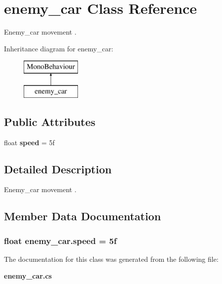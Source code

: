 \section{enemy\+\_\+car Class Reference}
\label{classenemy__car}


Enemy\+\_\+car movement .  


Inheritance diagram for enemy\+\_\+car\+:\begin{figure}[H]
\begin{center}
\leavevmode
\includegraphics[height=2.000000cm]{classenemy__car}
\end{center}
\end{figure}
\subsection*{Public Attributes}
\begin{DoxyCompactItemize}
\item 
float {\bf speed} = 5f
\end{DoxyCompactItemize}


\subsection{Detailed Description}
Enemy\+\_\+car movement . 



\subsection{Member Data Documentation}
\subsubsection[{speed}]{\setlength{\rightskip}{0pt plus 5cm}float enemy\+\_\+car.\+speed = 5f}\label{classenemy__car_a68b29b546daa237033646d23713f4578}


The documentation for this class was generated from the following file\+:\begin{DoxyCompactItemize}
\item 
{\bf enemy\+\_\+car.\+cs}\end{DoxyCompactItemize}
